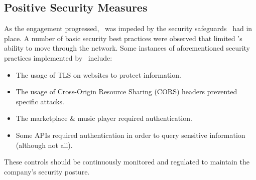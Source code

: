 \subsection{Positive Security Measures}
As the engagement progressed, \teamname\ was impeded by the security safeguards \cptc\ had in place.  A number of basic security best practices were observed that limited \teamname 's ability to move through the network. Some instances of aforementioned security practices implemented by \cptc\ include:

\begin{itemize}
    \item The usage of TLS on websites to protect information.
    \item The usage of Cross-Origin Resource Sharing (CORS) headers prevented specific attacks.
    \item The marketplace \& music player required authentication.
    \item Some APIs required authentication in order to query sensitive information (although not all).
\end{itemize}

These controls should be continuously monitored and regulated to maintain the company's security posture.

